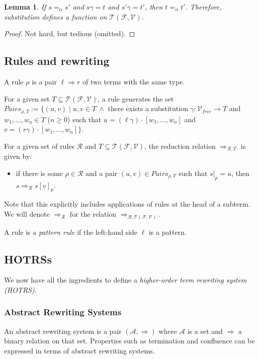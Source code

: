 \documentclass{lmcs}
\theoremstyle{theorem}\newtheorem{theorem}{Theorem}
\theoremstyle{theorem}\newtheorem{lemma}[theorem]{Lemma}
\theoremstyle{theorem}\newtheorem{corollary}[theorem]{Corollary}
\theoremstyle{definition}\newtheorem{definition}[theorem]{Definition}
\theoremstyle{definition}\newtheorem{example}[theorem]{Example}
\newcommand{\F}{\mathcal{F}}
\newcommand{\V}{\mathcal{V}}
\newcommand{\Vfree}{\mathcal{V}_{\mathit{free}}}
\newcommand{\Terms}{\mathcal{T}}
\newcommand{\Rules}{\mathcal{R}}
\newcommand{\arrz}{\Rightarrow}
\newcommand{\arr}[1]{\arrz_{#1}}
\newcommand{\mysubsection}[1]{\vspace{-12pt}\subsubsection{#1}}
\begin{document}
\begin{lemma}\label{lem:substitutionalpha}
If $s =_\alpha s'$ and $s\gamma = t$ and $s'\gamma = t'$, then $t =_\alpha t'$.
Therefore, substitution defines a function on $\Terms(\F,\V)$.
\end{lemma}

\begin{proof}
Not hard, but tedious (omitted).
\end{proof}

\subsection{Rules and rewriting}

A rule $\rho$ is a pair $\ell \arrz r$ of two terms with the same type.

For a given set $T \subseteq \Terms(\F,\V)$, a rule generates the set $\mathit{Pairs}_{\rho,T} :=
\{ (u,v) \mid u,v \in T\ \wedge$ there exists a substitution $\gamma : \Vfree \to T$ and
$w_1,\dots,w_n \in T$ ($n \geq 0$) such that $u = (\ell\gamma) \cdot [w_1,\dots,w_n]$ and $v =
(r\gamma) \cdot [w_1,\dots,w_n] \}$.

For a given set of rules $\Rules$ and $T \subseteq \Terms(\F,\V)$, the reduction relation
$\arr{\Rules,T}$ is given by:
\begin{itemize}
\item if there is some $\rho \in \Rules$ and a pair $(u,v) \in \mathit{Pairs}_{\rho,T}$ such that
  $s|_p = u$, then $s \arr{\Rules} s[v]_p$.
\end{itemize}

\medskip
Note that this explicitly includes applications of rules at the head of a subterm.
We will denote $\arr{\Rules}$ for the relation $\arr{\Rules,\Terms(\F,\V)}$.

A rule is a \emph{pattern rule} if the left-hand side $\ell$ is a pattern.

\subsection{HOTRSs}

We now have all the ingredients to define a \emph{higher-order term rewriting system (HOTRS)}.

\mysubsection{Abstract Rewriting Systems}

An abstract rewriting system is a pair $(\mathcal{A},\arrz)$ where $\mathcal{A}$ is a set and
$\arrz$ a binary relation on that set.  Properties such as termination and confluence can be
expressed in terms of abstract rewriting systems.
\end{document}
